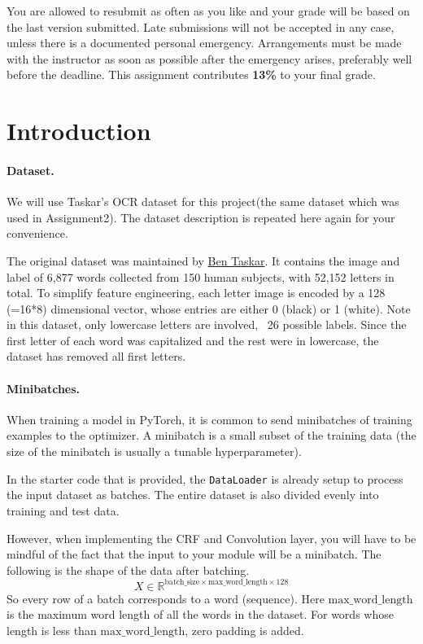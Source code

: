 \documentclass[11pt]{report}
\begin{document}
You are allowed to resubmit as often as you like and your grade will be based on the last version submitted.
Late submissions will not be accepted in any case, 
unless there is a documented personal emergency.  
Arrangements must be made with the instructor as soon as possible after the emergency arises,
preferably well before the deadline.
This assignment contributes {\bf 13\%} to your final grade.

\section{Introduction}
\label{sec:Introduction}

\paragraph{Dataset.}

We will use Taskar's OCR dataset for this project(the same dataset which was
used in Assignment2). The dataset description is repeated here again for your
convenience.


The original dataset was maintained by \href{https://en.wikipedia.org/wiki/Ben_Taskar}{Ben Taskar}.
It contains the image and label of 6,877 words collected from 150 human
subjects, with 52,152 letters in total. To simplify feature engineering, each
letter image is encoded by a 128 (=16*8) dimensional vector, whose entries are
either 0 (black) or 1 (white).
%
%
Note in this dataset, only lowercase letters are involved, \ie\ 26 possible
labels. Since the first letter of each word was capitalized and the rest were in
lowercase, the dataset has removed all first letters.



\paragraph{Minibatches.}
\label{par:Minibatches}
When training a model in PyTorch, it is common to send minibatches of training
examples to the optimizer. A minibatch is a small subset of the training data
(the size of the minibatch is usually a tunable hyperparameter).

In the starter code that is provided, the \texttt{DataLoader} is already setup
to process the input dataset as batches. The entire dataset is also divided
evenly into training and test data.

However, when implementing the CRF and Convolution layer, you will have to be
mindful of the fact that the input to your module will be a minibatch. The
following is the shape of the data after batching.
%
\begin{equation}
  X \in \mathbb{R}^{ \text{batch\_size} \times \text{max\_word\_length} \times 128}
\end{equation}
%
So every row of a batch corresponds to a word (sequence). Here
$\text{max\_word\_length}$ is the maximum word length of all the words in the
dataset. For words whose length is less than $\text{max\_word\_length}$, zero
padding is added.
\end{document}
